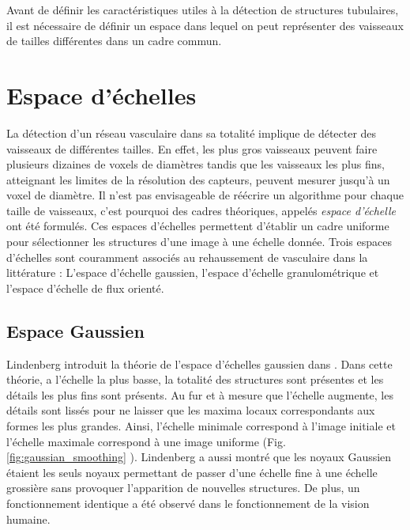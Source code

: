   Avant de définir les caractéristiques utiles à la détection de structures tubulaires, il est nécessaire de définir un espace dans lequel on peut représenter des vaisseaux de tailles différentes dans un cadre commun.

  \section{Espace d'échelles}
  \label{sec:EA:rehaussement:echelle}
  
  La détection d'un réseau vasculaire dans sa totalité implique de détecter des vaisseaux de différentes tailles. En effet, les plus gros vaisseaux peuvent faire plusieurs dizaines de voxels de diamètres tandis que les vaisseaux les plus fins, atteignant les limites de la résolution des capteurs, peuvent  mesurer jusqu'à un voxel de diamètre. Il n'est pas envisageable de réécrire un algorithme pour chaque taille de vaisseaux, c'est pourquoi des cadres théoriques, appelés \emph{espace d'échelle} ont été formulés. Ces espaces d'échelles permettent d'établir un cadre uniforme pour sélectionner les structures d'une image à une échelle donnée. Trois espaces d'échelles sont couramment associés au rehaussement de vasculaire dans la littérature : L'espace d'échelle gaussien, l'espace d'échelle granulométrique et l'espace d'échelle de flux orienté.
  
  \subsection{Espace Gaussien}
  \label{sec:EA:rehaussement:echelle:gaussien}
  
  Lindenberg introduit la théorie de l'espace d'échelles gaussien dans \cite{Lindeberg2013_scale}. Dans cette théorie, a l'échelle la plus basse, la totalité des structures sont présentes et les détails les plus fins sont présents. Au fur et à mesure que l'échelle augmente, les détails sont lissés pour ne laisser que les maxima locaux correspondants aux formes les plus grandes. Ainsi, l'échelle minimale correspond à l'image initiale et l'échelle maximale correspond à une image uniforme (Fig. \ref{fig:gaussian_smoothing} ). Lindenberg a aussi montré que les noyaux Gaussien étaient les seuls noyaux permettant de passer d'une échelle fine à une échelle grossière sans provoquer l'apparition de nouvelles structures. De plus, un fonctionnement identique a été observé dans le fonctionnement de la vision humaine.
  
